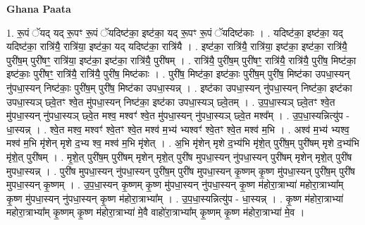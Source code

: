 \documentclass[17pt]{extarticle}
\begin{document}
\textbf{Ghana Paata } \newline

1. रू॒पं ॅयद् यद् रू॒पꣳ रू॒पं ॅयदिष्ट॑का॒ इष्ट॑का॒ यद् रू॒पꣳ रू॒पं ॅयदिष्ट॑काः । . यदिष्ट॑का॒ इष्ट॑का॒ यद् यदिष्ट॑का॒ रात्रि॑यै॒ रात्रि॑या॒ इष्ट॑का॒ यद् यदिष्ट॑का॒ रात्रि॑यै । . इष्ट॑का॒ रात्रि॑यै॒ रात्रि॑या॒ इष्ट॑का॒ इष्ट॑का॒ रात्रि॑यै॒ पुरी॑ष॒म् पुरी॑षꣳ॒॒ रात्रि॑या॒ इष्ट॑का॒ इष्ट॑का॒ रात्रि॑यै॒ पुरी॑षम् । . रात्रि॑यै॒ पुरी॑ष॒म् पुरी॑षꣳ॒॒ रात्रि॑यै॒ रात्रि॑यै॒ पुरी॑ष॒ मिष्ट॑का॒ इष्ट॑काः॒ पुरी॑षꣳ॒॒ रात्रि॑यै॒ रात्रि॑यै॒ पुरी॑ष॒ मिष्ट॑काः । . पुरी॑ष॒ मिष्ट॑का॒ इष्ट॑काः॒ पुरी॑ष॒म् पुरी॑ष॒ मिष्ट॑का उपधा॒स्यन् नु॑पधा॒स्यन् निष्ट॑काः॒ पुरी॑ष॒म् पुरी॑ष॒ मिष्ट॑का उपधा॒स्यन्न् । . इष्ट॑का उपधा॒स्यन् नु॑पधा॒स्यन् निष्ट॑का॒ इष्ट॑का उपधा॒स्यञ् छ्वे॒तꣳ श्वे॒त मु॑पधा॒स्यन् निष्ट॑का॒ इष्ट॑का उपधा॒स्यञ् छ्वे॒तम् । . उ॒प॒धा॒स्यञ् छ्वे॒तꣳ श्वे॒त मु॑पधा॒स्यन् नु॑पधा॒स्यञ् छ्वे॒त मश्व॒ मश्वꣳ॑ श्वे॒त मु॑पधा॒स्यन् नु॑पधा॒स्यञ् छ्वे॒त मश्व᳚म् । . उ॒प॒धा॒स्यन्नित्यु॑प - धा॒स्यन्न् । . श्वे॒त मश्व॒ मश्वꣳ॑ श्वे॒तꣳ श्वे॒त मश्व॑ म॒भ्य॑ भ्यश्वꣳ॑ श्वे॒तꣳ श्वे॒त मश्व॑ म॒भि । . अश्व॑ म॒भ्य॑ भ्यश्व॒ मश्व॑ म॒भि मृ॑शेन् मृशे द॒भ्य श्व॒ मश्व॑ म॒भि मृ॑शेत् । . अ॒भि मृ॑शेन् मृशे द॒भ्य॑भि मृ॑शे॒त् पुरी॑ष॒म् पुरी॑षम् मृशे द॒भ्य॑भि मृ॑शे॒त् पुरी॑षम् । . मृ॒शे॒त् पुरी॑ष॒म् पुरी॑षम् मृशेन् मृशे॒त् पुरी॑ष मुपधा॒स्यन् नु॑पधा॒स्यन् पुरी॑षम् मृशेन् मृशे॒त् पुरी॑ष मुपधा॒स्यन्न् । . पुरी॑ष मुपधा॒स्यन् नु॑पधा॒स्यन् पुरी॑ष॒म् पुरी॑ष मुपधा॒स्यन् कृ॒ष्णम् कृ॒ष्ण मु॑पधा॒स्यन् पुरी॑ष॒म् पुरी॑ष मुपधा॒स्यन् कृ॒ष्णम् । . उ॒प॒धा॒स्यन् कृ॒ष्णम् कृ॒ष्ण मु॑पधा॒स्यन् नु॑पधा॒स्यन् कृ॒ष्ण म॑होरा॒त्राभ्या॑ महोरा॒त्राभ्या᳚म् कृ॒ष्ण मु॑पधा॒स्यन् नु॑पधा॒स्यन् कृ॒ष्ण म॑होरा॒त्राभ्या᳚म् । . उ॒प॒धा॒स्यन्नित्यु॑प - धा॒स्यन्न् । . कृ॒ष्ण म॑होरा॒त्राभ्या॑ महोरा॒त्राभ्या᳚म् कृ॒ष्णम् कृ॒ष्ण म॑होरा॒त्राभ्या॑ मे॒वै वाहो॑रा॒त्राभ्या᳚म् कृ॒ष्णम् कृ॒ष्ण म॑होरा॒त्राभ्या॑ मे॒व । \newline
\end{document}
